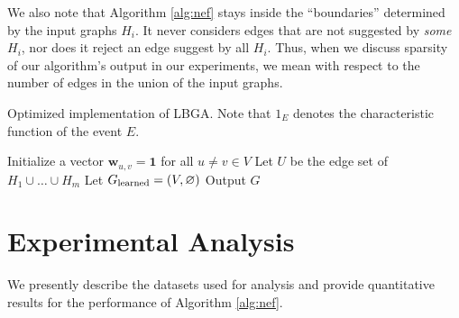 \documentclass[twoside,twocolumn]{article}
\begin{document}
We also note that Algorithm \ref{alg:nef} stays inside the ``boundaries'' 
determined by the input graphs $H_i$.  It never considers edges that are not
suggested by \emph{some} $H_i$, nor does it reject an edge suggest by all 
$H_i$. Thus, when we discuss sparsity of our algorithm's output in our
experiments, we mean with respect to the number of edges in the union of the
input graphs.

\begin{algorithm}[thb]
\caption{Optimized implementation of LBGA. Note that $1_E$ denotes the
characteristic function of the event $E$.}
\label{alg:nef}
   \DontPrintSemicolon
   \SetAlgoLined
   {\footnotesize
   Initialize a vector $\mathbf{w}_{u,v} = \mathbf{1}$ for all $u \neq v \in V$\;
   Let $U$ be the edge set of $H_1 \cup \dots \cup H_m$\;
   Let $G_\textup{learned} = (V, \varnothing)$ \;
   Output $G$\;
}
\end{algorithm}

\section{Experimental Analysis}
\label{sec:experiments}
We presently describe the datasets used for analysis and provide quantitative
results for the performance of Algorithm \ref{alg:nef}.  
\end{document}
